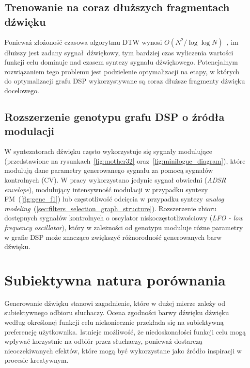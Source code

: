 \subsection{Trenowanie na coraz dłuższych fragmentach dźwięku}

Ponieważ złożoność czasowa algorytmu DTW wynosi $O(N^2/\log\log N)$~\cite{dtw_time_complexity},
im dłuższy jest zadany sygnał dźwiękowy, tym bardziej czas wyliczenia
wartości funkcji celu dominuje nad czasem syntezy sygnału dźwiękowego. Potencjalnym
rozwiązaniem tego problemu jest podzielenie optymalizacji na etapy, w których
do optymalizacji grafu DSP wykorzystywane są coraz dłuższe fragmenty dźwięku docelowego.

\subsection{Rozszerzenie genotypu grafu DSP o źródła modulacji}

W syntezatorach dźwięku często wykorzystuje się sygnały modulujące (przedstawione
na rysunkach~\ref{fig:mother32} oraz~\ref{fig:minilogue_diagram}), które modulują
dane parametry generowanego sygnału za pomocą sygnałów kontrolnych (CV). 
W pracy wykorzystano jedynie sygnał obwiedni (\textit{ADSR envelope}),
modulujący intensywność modulacji w przypadku syntezy FM~(\ref{fig:gene_f1})
lub częstotliwość odcięcia w przypadku syntezy
\textit{analog modeling}~(\ref{sec:filters_selection_graph_structure}).
Rozszerzenie zbioru dostępnych sygnałów kontrolnych o oscylator niskoczęstotliwościowy
(\textit{LFO - low frequency oscillator}), który w zależności od genotypu
moduluje różne parametry w grafie DSP może znacząco zwiększyć różnorodność
generowanych barw dźwięku.


\section{Subiektywna natura porównania}

Generowanie dźwięku stanowi zagadnienie,
które w dużej mierze zależy od subiektywnego odbioru słuchaczy.
Ocena zgodności barwy dźwięku dźwięku według określonej funkcji celu
niekoniecznie przekłada się na subiektywną preferencję użytkownika.
Istnieje możliwość, że niedoskonałości funkcji celu mogą wpływać korzystnie na 
odbiór przez słuchaczy, ponieważ dostarczą nieoczekiwanych efektów, 
które mogą być wykorzystane jako źródło inspiracji w procesie kreatywnym.
